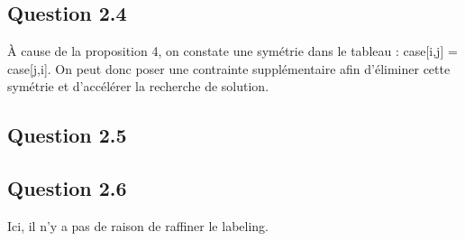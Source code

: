 \documentclass[a4paper]{article}
\begin{document}
\subsection{Question 2.4}
À cause de la proposition 4, on constate une symétrie dans le tableau : case[i,j] = case[j,i].
On peut donc poser une contrainte supplémentaire afin d'éliminer cette symétrie et d'accélérer la recherche de solution.
%

\subsection{Question 2.5}


\subsection{Question 2.6}
Ici, il n'y a pas de raison de raffiner le labeling.
\end{document}
